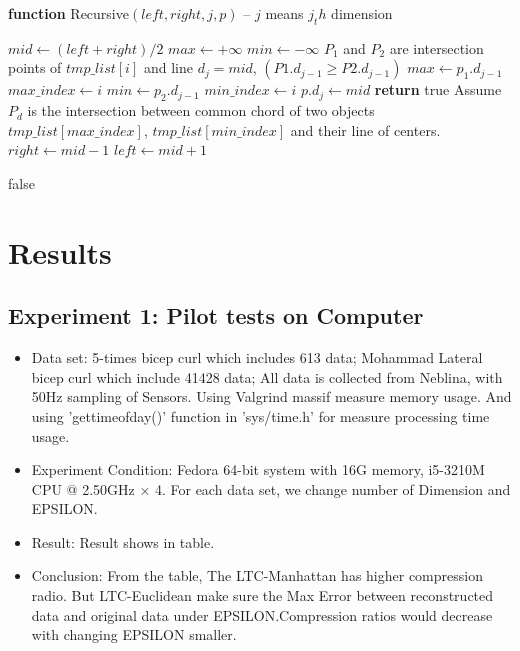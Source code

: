 \documentclass[10pt, conference, compsocconf]{IEEEtran}
\newcommand{\todo}[1]{\marginpar{\parbox{18mm}{\flushleft\tiny\color{red}\textbf{TODO}:
      #1}}}
\begin{document}
\begin{algorithm}
    \begin{flushleft}
        \textbf{function} Recursive$(left, right, j, p)$  -- $j$ means $j_th$ dimension
    \end{flushleft}
    \begin{algorithmic}[1]
            \State $mid \gets (left + right)/2$
            \State $max \gets +\infty$
            \State $min \gets -\infty$
                \State $P_1$ and $P_2$ are intersection points of $tmp\_list[i]$ and line $d_{j}=mid$, $(P1.d_{j-1}\geqslant P2.d_{j-1})$
                    \State $max \gets p_1.d_{j-1}$
                    \State $max\_index \gets i$
                \EndIf
                    \State $min \gets p_2.d_{j-1}$
                    \State $min\_index \gets i$
                \EndIf
            \EndFor
                \State $p.d_j \gets mid$
                    \State \textbf{return} true
                \EndIf
            \EndIf
            \State Assume $P_d$ is the intersection between common chord of two objects $tmp\_list[max\_index]$, $tmp\_list[min\_index]$ and their line of centers.
                \State $right \gets mid-1$
                \State $left \gets mid+1$
            \EndIf

        \EndWhile
        \Return false
    \end{algorithmic}
\end{algorithm}

\section{Results}
\todo{ result table ?}
\subsection{Experiment 1: Pilot tests on Computer}
\begin{itemize}
    \item Data set: 5-times bicep curl which includes 613 data;
                    Mohammad Lateral bicep curl which include 41428 data;
                    All data is collected from Neblina, with 50Hz sampling of Sensors.
                    Using Valgrind massif measure memory usage. And using 'gettimeofday()' function in 'sys/time.h' for measure processing time usage.
    \item Experiment Condition: Fedora 64-bit system with 16G memory, i5-3210M CPU @ 2.50GHz × 4. For each data set, we change number of Dimension and EPSILON.
    \item Result: Result shows in table.
    \item Conclusion: From the table, The LTC-Manhattan has higher compression radio. But LTC-Euclidean make sure the Max Error between reconstructed data and original data under EPSILON.Compression ratios would decrease with changing EPSILON smaller.
\end{itemize}
\end{document}
